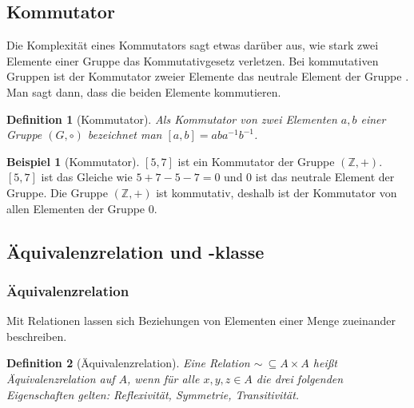 \documentclass[12pt,a4paper, usenames, dvipsnames]{article}
\theoremstyle{mystyle}
\newtheorem{definition}{Definition}
\theoremstyle{definition}
\newtheorem{bsp}{Beispiel}[definition]
\begin{document}
%
%
%
%
%
%
%
%
%
%
%
%

\subsection{Kommutator} 
 \label{Abschnitt_Kommutator}
Die Komplexität eines Kommutators sagt etwas darüber aus, wie stark zwei Elemente einer Gruppe das Kommutativgesetz verletzen. Bei kommutativen Gruppen ist der Kommutator zweier Elemente das neutrale Element der Gruppe \cite{TD}. Man sagt dann, dass die beiden Elemente kommutieren. 


\begin{definition}[Kommutator]
Als Kommutator von zwei Elementen $a, b$ einer Gruppe $(G, \circ)$  bezeichnet man $[a,b] = aba^{-1}b^{-1}$.
\end{definition}


\begin{bsp}[Kommutator]

$[5,7]$ ist ein Kommutator der Gruppe $(\mathbb{Z}, +)$. $[5,7]$ ist das Gleiche wie $5+7-5-7 = 0$ und $0$ ist das neutrale Element der Gruppe. Die Gruppe $(\mathbb{Z}, +)$ ist kommutativ, deshalb ist der Kommutator von allen Elementen der Gruppe $0$.

\end{bsp}
%
%
%
%
%
%
%
%
%
%
%
%
%

\subsection{Äquivalenzrelation und -klasse}

 
\subsubsection*{Äquivalenzrelation}

 \label{Abschnitt_Äquivalenrelationen}

Mit Relationen lassen sich Beziehungen von Elementen einer Menge zueinander beschreiben.

\begin{definition}[Äquivalenzrelation]
Eine Relation $\sim \ \subseteq A \times A$ heißt Äquivalenzrelation auf $A$, wenn für alle $x, y, z \in A$ die drei folgenden Eigenschaften gelten: Reflexivität, Symmetrie, Transitivität.
\end{definition}
\end{document}

